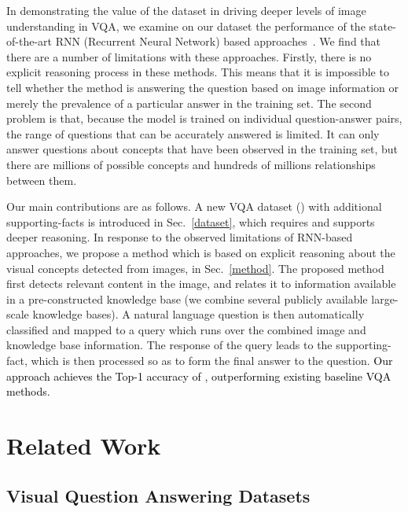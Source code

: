 \documentclass[10pt,journal]{IEEEtran}
\def\bluettt{\textcolor{black}}
\begin{document}
In demonstrating the value of the dataset in driving deeper levels of image understanding in VQA, we
examine on our \KBName dataset 
the performance of the state-of-the-art RNN (Recurrent Neural Network) based approaches~\cite{antol2015vqa,malinowski2014towards,ren2015image}.  We find that there are a number of limitations with these approaches. Firstly, there is no explicit reasoning process in these methods. This means that it is impossible to tell whether the method is answering the question based on image information or merely the prevalence of a particular answer in the training set. The second problem is that, because the model is trained on individual question-answer pairs, the range of questions that can be accurately answered is limited. It can only answer questions about concepts that have been observed in the training set, but there are millions of possible concepts and hundreds of millions relationships between them. 

Our main contributions are as follows.
A new VQA dataset (\KBName) with additional supporting-facts is introduced in Sec.~\ref{dataset}, which requires and supports deeper reasoning.
In response to the observed limitations of RNN-based approaches, we propose a method which is based on explicit reasoning about the visual concepts detected from images, in Sec.~\ref{method}. The proposed method first detects relevant content in the image, and relates it to information available in a pre-constructed knowledge base (we combine several publicly available large-scale knowledge bases). A natural language question is then automatically classified and mapped to a query which runs over the combined image and knowledge base information. The response of the query leads to the supporting-fact, which is then processed so as to form the final answer to the question. 
\bluettt{Our approach achieves the Top-1 accuracy of , outperforming existing baseline VQA methods.}









\section{Related Work}
\label{relwork}

\subsection{Visual Question Answering Datasets}
\end{document}
